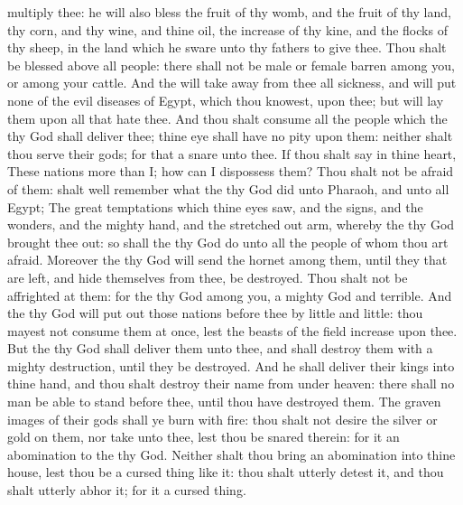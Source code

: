 {multiply thee: he will also
bless the
fruit of thy
womb, and the
fruit of thy
land, thy
corn, and thy
wine, and thine
oil, the
increase of thy
kine, and the
flocks of thy
sheep, in the
land which he
sware unto thy
fathers to
give thee.
Thou shalt be
blessed above all
people: there shall not be
male or female
barren among you, or among your
cattle.
And the
{} will take
away from thee all
sickness, and will
put none of the
evil
diseases of
Egypt, which thou
knowest, upon thee; but will
lay them upon all
{} that
hate thee.
And thou shalt
consume all the
people which the
{} thy
God shall
deliver thee; thine
eye shall have no
pity upon them: neither shalt thou
serve their
gods; for that
{} a
snare unto thee.
If thou shalt
say in thine
heart, These
nations
{}
more than I;
how
can I
dispossess them?
Thou shalt not be
afraid of them:
{} shalt
well
remember what the
{} thy
God
did unto
Pharaoh, and unto all
Egypt;
The
great
temptations which thine
eyes
saw, and the
signs, and the
wonders, and the
mighty
hand, and the stretched
out
arm, whereby the
{} thy
God brought thee
out: so shall the
{} thy
God
do unto all the
people of whom thou art
afraid.
Moreover the
{} thy
God will
send the
hornet among them, until they that are
left, and
hide themselves
from thee, be
destroyed.
Thou shalt not be
affrighted
at them: for the
{} thy
God
{}
among you, a
mighty
God and
terrible.
And the
{} thy
God will put
out
those
nations
before thee by
little and
little: thou
mayest not
consume them at
once, lest the
beasts of the
field
increase upon thee.
But the
{} thy
God shall
deliver them unto
thee, and shall
destroy them with a
mighty
destruction, until they be
destroyed.
And he shall
deliver their
kings into thine
hand, and thou shalt
destroy their
name from under
heaven: there shall no
man be able to
stand
before thee, until thou have
destroyed them.
The graven
images of their
gods shall ye
burn with
fire: thou shalt not
desire the
silver or
gold
{} on them, nor
take
{} unto thee, lest thou be
snared therein: for it
{} an
abomination to the
{} thy
God.
Neither shalt thou
bring an
abomination into thine
house, lest thou be a cursed
thing like it:
{} thou shalt
utterly
detest it, and thou shalt
utterly
abhor it; for it
{} a cursed
thing.

}
